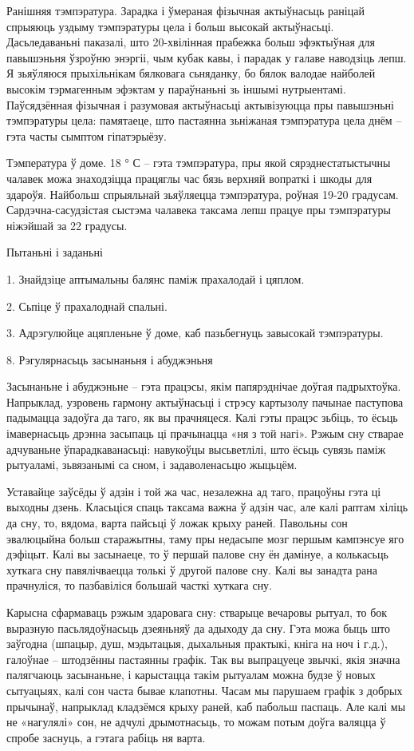 Ранішняя тэмпэратура. Зарадка і ўмераная фізычная актыўнасьць раніцай спрыяюць уздыму тэмпэратуры цела і больш высокай актыўнасьці. Дасьледаваньні паказалі, што 20-хвілінная прабежка больш эфэктыўная для павышэньня ўзроўню энэргіі, чым кубак кавы, і парадак у галаве наводзіць лепш. Я зьяўляюся прыхільнікам бялковага сьняданку, бо бялок валодае найболей высокім тэрмагенным эфэктам у параўнаньні зь іншымі нутрыентамі. Паўсядзённая фізычная і разумовая актыўнасьці актывізуюцца пры павышэньні тэмпэратуры цела: памятаеце, што пастаянна зьніжаная тэмпэратура цела днём – гэта часты сымптом гіпатэрыёзу.

Тэмпература ў доме. 18 ° С – гэта тэмпэратура, пры якой сярэднестатыстычны чалавек можа знаходзіцца працяглы час бязь верхняй вопраткі і шкоды для здароўя. Найбольш спрыяльнай зьяўляецца тэмпэратура, роўная 19-20 градусам. Сардэчна-сасудзістая сыстэма чалавека таксама лепш працуе пры тэмпэратуры ніжэйшай за 22 градусы.

Пытаньні і заданьні

1. Знайдзіце аптымальны балянс паміж прахалодай і цяплом.

2. Сьпіце ў прахалоднай спальні.

3. Адрэгулюйце ацяпленьне ў доме, каб пазьбегнуць завысокай тэмпэратуры.


8. Рэгулярнасьць засынаньня і абуджэньня

Засынаньне і абуджэньне – гэта працэсы, якім папярэднічае доўгая падрыхтоўка. Напрыклад, узровень гармону актыўнасьці і стрэсу картызолу пачынае паступова падымацца задоўга да таго, як вы прачняцеся. Калі гэты працэс зьбіць, то ёсьць імавернасьць дрэнна засыпаць ці прачынацца «ня з той нагі». Рэжым сну стварае адчуваньне ўпарадкаванасьці: навукоўцы высьветлілі, што ёсьць сувязь паміж рытуаламі, зьвязанымі са сном, і задаволенасьцю жыцьцём.

Уставайце заўсёды ў адзін і той жа час, незалежна ад таго, працоўны гэта ці выходны дзень. Класьціся спаць таксама важна ў адзін час, але калі раптам хіліць да сну, то, вядома, варта пайсьці ў ложак крыху раней. Павольны сон эвалюцыйна больш старажытны, таму пры недасыпе мозг першым кампэнсуе яго дэфіцыт. Калі вы засынаеце, то ў першай палове сну ён дамінуе, а колькасьць хуткага сну павялічваецца толькі ў другой палове сну. Калі вы занадта рана прачнуліся, то пазбавіліся большай часткі хуткага сну.

Карысна сфармаваць рэжым здаровага сну: стварыце вечаровы рытуал, то бок выразную пасьлядоўнасьць дзеяньняў да адыходу да сну. Гэта можа быць што заўгодна (шпацыр, душ, мэдытацыя, дыхальныя практыкі, кніга на ноч і г.д.), галоўнае – штодзённы пастаянны графік. Так вы выпрацуеце звычкі, якія значна палягчаюць засынаньне, і карыстацца такім рытуалам можна будзе ў новых сытуацыях, калі сон часта бывае клапотны. Часам мы парушаем графік з добрых прычынаў, напрыклад кладзёмся крыху раней, каб пабольш паспаць. Але калі мы не «нагулялі» сон, не адчулі дрымотнасьць, то можам потым доўга валяцца ў спробе заснуць, а гэтага рабіць ня варта.

